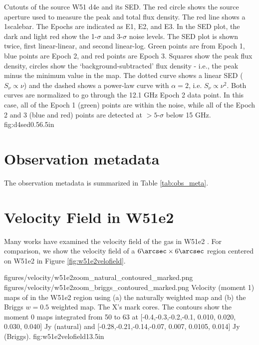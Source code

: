 {Cutouts of the source W51 d4e and its SED.
The red circle shows the source aperture used to measure the peak and total
flux density.  The red line shows a 1\arcsec scalebar.  The Epochs are indicated as E1,
E2, and E3.
In the SED plot, the dark and light red show the 1-$\sigma$ and 3-$\sigma$
noise levels.  The SED plot is shown twice, first linear-linear, and second
linear-log.
Green points are from Epoch 1, blue points are Epoch 2, and red points are
Epoch 3.  Squares show the peak flux density, circles show the
`background-subtracted' flux density - i.e., the peak minus the minimum value
in the map.
The dotted curve shows a linear SED ($S_\nu \propto \nu$) and the dashed shows
a power-law curve with $\alpha=2$, i.e. $S_\nu \propto \nu^2$.  Both curves are
normalized to go through the 12.1 GHz Epoch 2 data point.  In this case, all of
the Epoch 1 (green) points are within the noise, while all of the Epoch 2 and 3
(blue and red) points are detected at $>5$-$\sigma$ below 15 GHz.
}
{fig:d4sed}{0.5}{6.5in}

%

\section{Observation metadata}
\label{sec:obsmeta}
The observation metadata is summarized in Table \ref{tab:obs_meta}.




\section{Velocity Field in W51e2}
\label{sec:vfield}
Many works have examined the velocity field of the gas in W51e2
\citep{Zhang1997a,Keto2008b,Shi2010b,Shi2010a,Goddi2016a}.  For comparison, we
show the velocity field of a $6\arcsec\times6\arcsec$ region centered on W51e2
in Figure
\ref{fig:w51e2velofield}.

\FigureTwo
{figures/velocity/w51e2zoom_natural_contoured_marked.png}
{figures/velocity/w51e2zoom_briggs_contoured_marked.png}
{Velocity (moment 1) maps of \ortho \twotwo in the W51e2 region using (a) the
naturally weighted map and (b) the Briggs $w=0.5$ weighted map.  The X's mark
\citet{Shi2010a} cores.   
The contours show the moment 0 maps integrated from 50 to 63 \kms at
[-0.4,-0.3,-0.2,-0.1, 0.010, 0.020, 0.030, 0.040] Jy \kms (natural) and
[-0.28,-0.21,-0.14,-0.07, 0.007, 0.0105, 0.014] Jy \kms (Briggs).
}
{fig:w51e2velofield}{1}{3.5in}


